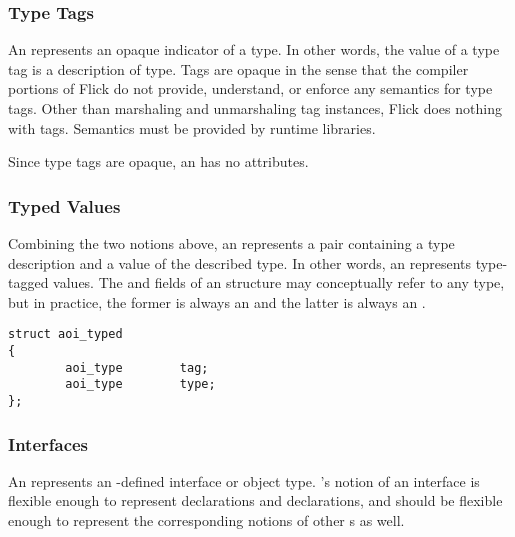\subsubsection{Type Tags}

An  represents an opaque indicator of a type.  In other
words, the value of a type tag is a description of type.  Tags are opaque in
the sense that the compiler portions of Flick do not provide, understand, or
enforce any semantics for type tags.  Other than marshaling and unmarshaling
tag instances, Flick does nothing with tags.  Semantics must be provided by
runtime libraries.

Since type tags are opaque, an  has no attributes.


\subsubsection{Typed Values}

Combining the two notions above, an  represents a pair
containing a type description and a value of the described type.  In other
words, an  represents type-tagged values.  The  and
 fields of an  structure may conceptually refer to any
\AOI{} type, but in practice, the former is always an  and
the latter is always an \@.

\begin{verbatim}
struct aoi_typed
{
        aoi_type        tag;
        aoi_type        type;
};
\end{verbatim}


\subsubsection{Interfaces}

An  represents an \IDL{}-defined interface or object type.
\AOI{}'s notion of an interface is flexible enough to represent \CORBA{}
 declarations and \ONCRPC{}  declarations, and
should be flexible enough to represent the corresponding notions of other
\IDL{}s as well.

